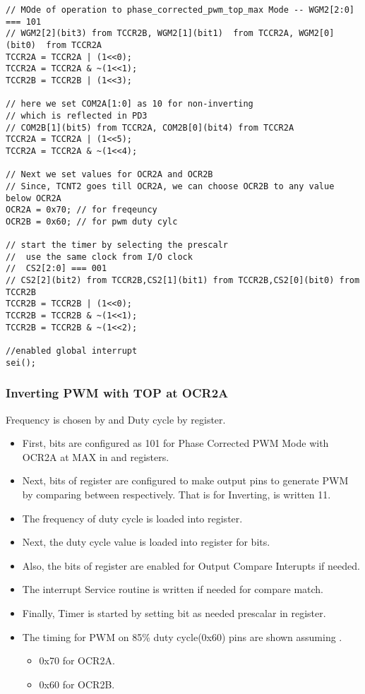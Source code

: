 \documentclass{article}
\begin{document}
\begin{verbatim}
// MOde of operation to phase_corrected_pwm_top_max Mode -- WGM2[2:0] === 101
// WGM2[2](bit3) from TCCR2B, WGM2[1](bit1)  from TCCR2A, WGM2[0](bit0)  from TCCR2A
TCCR2A = TCCR2A | (1<<0);
TCCR2A = TCCR2A & ~(1<<1);
TCCR2B = TCCR2B | (1<<3);		

// here we set COM2A[1:0] as 10 for non-inverting
// which is reflected in PD3
// COM2B[1](bit5) from TCCR2A, COM2B[0](bit4) from TCCR2A
TCCR2A = TCCR2A | (1<<5);
TCCR2A = TCCR2A & ~(1<<4);
    
// Next we set values for OCR2A and OCR2B
// Since, TCNT2 goes till OCR2A, we can choose OCR2B to any value below OCR2A
OCR2A = 0x70; // for freqeuncy
OCR2B = 0x60; // for pwm duty cylc

// start the timer by selecting the prescalr
//  use the same clock from I/O clock
//  CS2[2:0] === 001
// CS2[2](bit2) from TCCR2B,CS2[1](bit1) from TCCR2B,CS2[0](bit0) from TCCR2B
TCCR2B = TCCR2B | (1<<0);
TCCR2B = TCCR2B & ~(1<<1);
TCCR2B = TCCR2B & ~(1<<2);

//enabled global interrupt
sei();
\end{verbatim}

\subsubsection{Inverting PWM with TOP at  OCR2A}
\quad Frequency is chosen by  and Duty cycle by  register.
\begin{itemize}
    \item First,  bits are configured as 101 for Phase Corrected PWM Mode with OCR2A at MAX in  and  registers.
    \item Next,   bits of  register are configured to make output  pins to generate PWM by comparing between  respectively. That is for Inverting,  is written 11.
    \item The frequency of duty cycle is loaded into  register.
    \item Next, the duty cycle value is loaded into  register for  bits.
    \item Also, the  bits of  register  are enabled for Output Compare Interupts if needed.
    \item The interrupt Service routine is written if needed for compare match.
    \item Finally, Timer is started by setting  bit as needed prescalar in  register.
    \item The timing for PWM on 85\% duty cycle(0x60)   pins are shown assuming .
    \begin{itemize}
        \item 0x70 for OCR2A.
        \item 0x60 for OCR2B.
    \end{itemize}
\end{itemize}
\end{document}
